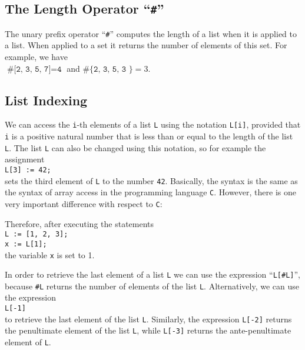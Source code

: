 \subsection{The Length Operator ``\texttt{\#}''}
The unary prefix operator  ``\texttt{\#}'' computes the length of a list when it is applied to a
list.  When applied to a set it returns the number of elements of this set.  For example, we have
\\[0.2cm]
\hspace*{1.3cm}
$\texttt{\# [2, 3, 5, 7]} = \texttt{4}$ \quad and \quad 
$\texttt{\# \{2, 3, 5, 3 \}} = 3$.

\subsection{List Indexing}
We can access the \texttt{i}-th elements of a list \texttt{L} using the notation \texttt{L[i]}, provided that \texttt{i} is
a positive natural number that is less than or equal to the length of the list \texttt{L}.
The list \texttt{L} can
also be changed using this notation, so for example the assignment
\\[0.2cm]
\hspace*{1.3cm}
\texttt{L[3] := 42;}
\\[0.2cm]
sets the third element of \texttt{L} to the number \texttt{42}.  Basically, the syntax is the same
as the syntax of array access in the programming language \texttt{C}.  However, there is one very
important difference with respect to \texttt{C}:

      \begin{center}
      \colorbox{red}{}
      \end{center}      

\noindent
Therefore, after executing the statements
\\[0.2cm]
\hspace*{1.3cm} \texttt{L := [1, 2, 3];} \\
\hspace*{1.3cm} \texttt{x := L[1];}
\\[0.2cm]
the variable  \texttt{x} is set to 1.  

In order to retrieve the last element of a list \texttt{L} we can use the expression ``\texttt{L[\#L]}'',
because \texttt{\#L} returns the number of elements of the list  \texttt{L}.  Alternatively, we can
use the expression
\\[0.2cm]
\hspace*{1.3cm}
\texttt{L[-1]}
\\[0.2cm]
to retrieve the last element of the list  \texttt{L}.  Similarly, the expression
\texttt{L[-2]} returns the penultimate element of the list \texttt{L},  while \texttt{L[-3]} returns
the ante-penultimate element of \texttt{L}. 

